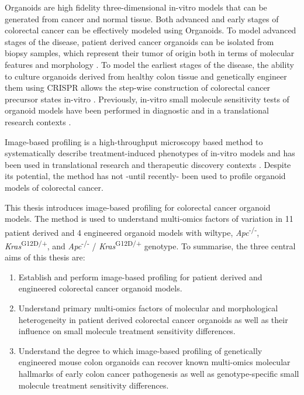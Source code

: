 \begin{flushleft}
Organoids are high fidelity three-dimensional in-vitro models that can be generated from cancer and normal tissue. Both advanced and early stages of colorectal cancer can be effectively modeled using Organoids. To model advanced stages of the disease, patient derived cancer organoids can be isolated from biopsy samples, which represent their tumor of origin both in terms of molecular features and morphology \citep{pauliPersonalizedVitroVivo2017a}. To model the earliest stages of the disease, the ability to culture organoids derived from healthy colon tissue and genetically engineer them using CRISPR allows the step-wise construction of colorectal cancer precursor states in-vitro \citep{matanoModelingColorectalCancer2015a, drostUseCRISPRmodifiedHuman2017}. Previously, in-vitro small molecule sensitivity tests of organoid models have been performed in diagnostic and in a translational research contexts \citep{vandeweteringProspectiveDerivationLiving2015, vlachogiannisPatientderivedOrganoidsModel2018, ganeshRectalCancerOrganoid2019, ooftPatientderivedOrganoidsCan2019, yaoPatientDerivedOrganoidsPredict2020}. 
\par
Image-based profiling is a high-throughput microscopy based method to systematically describe treatment-induced phenotypes of in-vitro models and has been used in translational research and therapeutic discovery contexts \citep{caicedoApplicationsImagebasedProfiling2016}. Despite its potential, the method has not -until recently- \citep{betgeDruginducedPhenotypicLandscape2022} been used to profile organoid models of colorectal cancer.
\par


This thesis introduces image-based profiling for colorectal cancer organoid models. The method is used to understand multi-omics factors of variation in 11 patient derived and 4 engineered organoid models with wiltype, \textit{Apc}\textsuperscript{-/-}, \textit{Kras}\textsuperscript{G12D/+}, and \textit{Apc}\textsuperscript{-/-} / \textit{Kras}\textsuperscript{G12D/+}
 genotype. To summarise, the three central aims of this thesis are:
\begin{enumerate}
    \item Establish and perform image-based profiling for patient derived and engineered colorectal cancer organoid models.
    \item Understand primary multi-omics factors of molecular and morphological heterogeneity in patient derived colorectal cancer organoids as well as their influence on small molecule treatment sensitivity differences.
    \item Understand the degree to which image-based profiling of genetically engineered mouse colon organoids can recover known multi-omics molecular hallmarks of early colon cancer pathogenesis as well as genotype-specific small molecule treatment sensitivity differences.
\end{enumerate}


\end{flushleft}